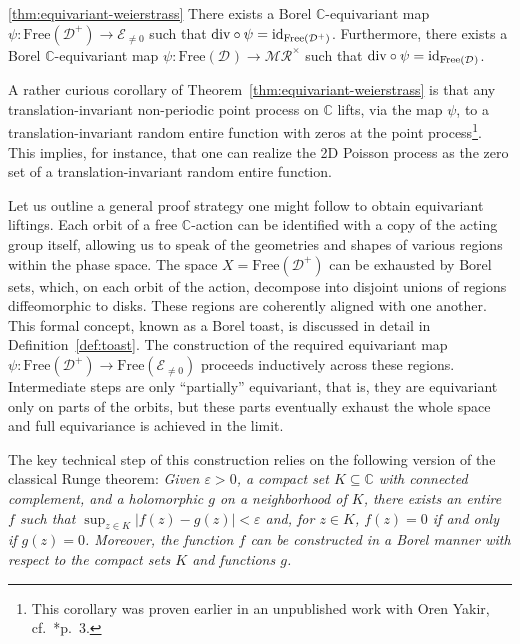 \documentclass[12pt]{paper}
\numberwithin{equation}{section}
\theoremstyle{plain}
\theoremstyle{definition}
\newcommand{\C}{\mathbb{C}}
\newcommand{\merom}[1][]{\mathcal{MR}_{#1}}
\newcommand{\meromnz}{\merom^{\times}}
\newcommand{\holom}[1][]{\mathcal{E}_{#1}}
\newcommand{\divis}[1][]{\mathcal{D}_{#1}}
\newcommand{\divisp}[1][]{\divis[#1]^{+}}
\newcommand{\dm}{\mathrm{div}}      %
\newcommand{\free}{\mathrm{Free}}
\renewcommand{\epsilon}{\varepsilon}
\begin{document}
\begin{customthm}{\ref*{thm:equivariant-weierstrass}}
  There exists a Borel \(\C\)-equivariant map \(\psi : \free(\divisp) \to \holom[\ne 0]\) such that
  \(\dm\circ \psi={\rm id}_{\free(\divisp)}\).  Furthermore, there exists a Borel \(\C\)-equivariant
  map \(\psi : \free(\divis) \to \meromnz\) such that \(\dm\circ\psi={\rm id}_{\free(\divis)}\).
\end{customthm}

A rather curious corollary of Theorem~\ref{thm:equivariant-weierstrass} is that any
translation-invariant non-periodic point process on \(\C\) lifts, via the map \(\psi\), to a
translation-invariant random entire function with zeros at the point process\footnote{This corollary
  was proven earlier in an unpublished work with Oren Yakir, cf.~\cite{MR4658613}*{p.~3}.}. This
implies, for instance, that one can realize the 2D Poisson process as the zero set of a
translation-invariant random entire function.

Let us outline a general proof strategy one might follow to obtain equivariant liftings.  Each orbit
of a free \(\C\)-action can be identified with a copy of the acting group itself, allowing us to
speak of the geometries and shapes of various regions within the phase space.  The space
\(X = \free(\divisp)\) can be exhausted by Borel sets, which, on each orbit of the action, decompose
into disjoint unions of regions diffeomorphic to disks. These regions are coherently aligned with
one another.  This formal concept, known as a Borel toast, is discussed in detail in
Definition~\ref{def:toast}.  The construction of the required equivariant map
\(\psi : \free(\divisp) \to \free(\holom[\ne 0])\) proceeds inductively across these regions.
Intermediate steps are only ``partially'' equivariant, that is, they are equivariant only on parts
of the orbits, but these parts eventually exhaust the whole space and full equivariance is achieved
in the limit.

The key technical step of this construction relies on the following version of the classical Runge
theorem: \emph{Given \(\epsilon > 0\), a compact set \(K \subseteq \C\) with connected complement,
  and a holomorphic \(g\) on a neighborhood of \(K\), there exists an entire \(f\) such that
  \(\sup_{z \in K}|f(z) - g(z)| < \epsilon\) and, for \(z \in K\), \(f(z) = 0\) if and only if
  \(g(z) = 0\).  Moreover, the function \(f\) can be constructed in a Borel manner with respect to
  the compact sets \(K\) and functions \(g\).}
\end{document}
